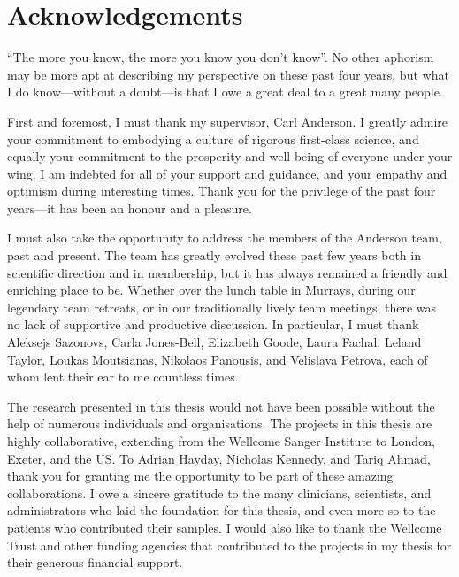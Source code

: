 %
%

\chapter{Acknowledgements}

\enquote{The more you know, the more you know you don't know}.
No other aphorism may be more apt at describing my perspective on these past four years,
but what I do know---without a doubt---is that I owe a great deal to a great many people.

First and foremost, I must thank my supervisor, Carl Anderson.
I greatly admire your commitment to embodying a culture of rigorous first-class science,
and equally your commitment to the prosperity and well-being of everyone under your wing. 
I am indebted for all of your support and guidance, 
and your empathy and optimism during interesting times.
Thank you for the privilege of the past four years---it has been an honour and a pleasure.

I must also take the opportunity to address the members of the Anderson team, past and present.
The team has greatly evolved these past few years both in scientific direction and in membership,
but it has always remained a friendly and enriching place to be. 
Whether over the lunch table in Murrays,
during our legendary team retreats,
or in our traditionally lively team meetings,
there was no lack of supportive and productive discussion.
In particular, I must thank
    Aleksejs Sazonovs,
    Carla Jones-Bell,
    Elizabeth Goode,
    Laura Fachal,
    Leland Taylor,
    Loukas Moutsianas, 
    Nikolaos Panousis,
    and Velislava Petrova,
    each of whom lent their ear to me countless times.

The research presented in this thesis would not have been possible without the help of numerous individuals and organisations.
The projects in this thesis are highly collaborative, extending from the Wellcome Sanger Institute to London, Exeter, and the US.
To Adrian Hayday, Nicholas Kennedy, and Tariq Ahmad, 
thank you for granting me the opportunity to be part of these amazing collaborations.
I owe a sincere gratitude to the many clinicians, scientists, and administrators who laid the foundation for this thesis,
and even more so to the patients who contributed their samples.
I would also like to thank the Wellcome Trust and other funding agencies that contributed to the projects in my thesis for their generous financial support.

